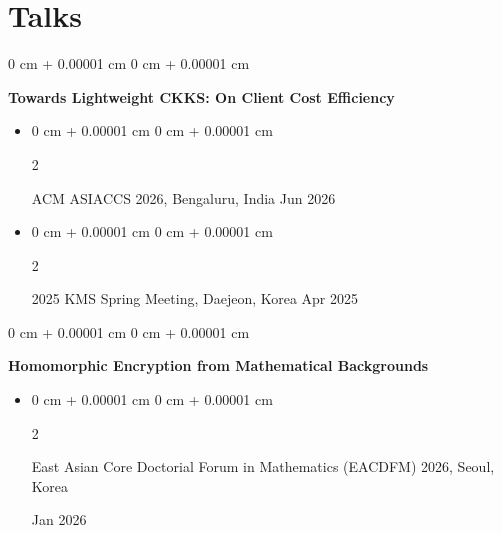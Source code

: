 \documentclass[10pt, letterpaper]{article}
\newenvironment{highlights}{
    \begin{itemize}[
        topsep=0.10 cm,
        parsep=0.10 cm,
        partopsep=0pt,
        itemsep=0pt,
        leftmargin=0 cm + 10pt
    ]
}{
    \end{itemize}
} %
\newenvironment{onecolentry}{
    \begin{adjustwidth}{
        0 cm + 0.00001 cm
    }{
        0 cm + 0.00001 cm
    }
}{
    \end{adjustwidth}
} %
\newenvironment{twocolentry}[2][]{
    \onecolentry
    \def\secondColumn{#2}
    \setcolumnwidth{\fill, 4.5 cm}
    \begin{paracol}{2}
}{
    \switchcolumn \raggedleft \secondColumn
    \end{paracol}
    \endonecolentry
} %
\begin{document}



    \section{Talks}

    \begin{onecolentry}
        \textbf{Towards Lightweight CKKS: On Client Cost Efficiency} 
    \end{onecolentry}
    \begin{highlights}
        \item \begin{twocolentry}{Jun 2026}
        ACM ASIACCS 2026, Bengaluru, India \end{twocolentry}
        \item \begin{twocolentry}{Apr 2025}
        2025 KMS Spring Meeting, Daejeon, Korea \end{twocolentry}
    \end{highlights}
    \vspace{0.2 cm}

    \begin{onecolentry}
        \textbf{Homomorphic Encryption from Mathematical Backgrounds} 
    \end{onecolentry}
    \begin{highlights}
        \item \begin{twocolentry}{Jan 2026}
        East Asian Core Doctorial Forum in Mathematics (EACDFM) 2026, Seoul, Korea
        \end{twocolentry}
    \end{highlights}
    
\end{document}
